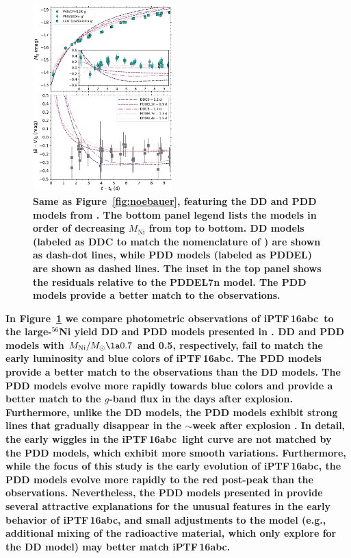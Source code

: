 \documentclass[twocolumn]{aastex61}
\newcommand{\abc}{iPTF\,16abc}
\begin{document}
\begin{figure}[]
  \centering
  \includegraphics[width=0.48\textwidth]{compare_Dessart.pdf}
  \caption{
  \textbf{Same as Figure~\ref{fig:noebauer}, featuring the DD and PDD models
  from \citet{2014MNRAS.441..532D}. The bottom panel legend lists the models
  in order of decreasing $M_\mathrm{Ni}$ from top to bottom. DD models
  (labeled as DDC to match the nomenclature of \citealt{2014MNRAS.441..532D})
  are shown as dash-dot lines, while PDD models (labeled as PDDEL) are shown
  as dashed lines. The inset in the top panel shows the residuals relative to
  the PDDEL7n model. The PDD models provide a better match to the
  observations.} 
  } \label{fig:dessart} 
\end{figure}

\textbf{In Figure~\ref{fig:dessart} we compare photometric observations of
\abc\ to the large-$^{56}$Ni yield DD and PDD models presented in
\citet{2014MNRAS.441..532D}. DD and PDD models with $M_\mathrm{Ni}/M_\odot \la
0.7$ and 0.5, respectively, fail to match the early luminosity and blue colors
of \abc. The PDD models provide a better match to the observations than the DD
models. The PDD models evolve more rapidly towards blue colors and provide a
better match to the $g$-band flux in the days after explosion. Furthermore,
unlike the DD models, the PDD models exhibit strong  lines that
gradually disappear in the $\sim$week after explosion
\citet{2014MNRAS.441..532D}. In detail, the early wiggles in the \abc\ light
curve are not matched by the PDD models, which exhibit more smooth variations.
Furthermore, while the focus of this study is the early evolution of \abc, the
PDD models evolve more rapidly to the red post-peak than the observations.
Nevertheless, the PDD models presented in \citet{2014MNRAS.441..532D} provide
several attractive explanations for the unusual features in the early behavior
of \abc, and small adjustments to the model (e.g., additional mixing of the
radioactive material, which \citeauthor{2014MNRAS.441..532D} only explore for
the DD model) may better match \abc.}
\end{document}
